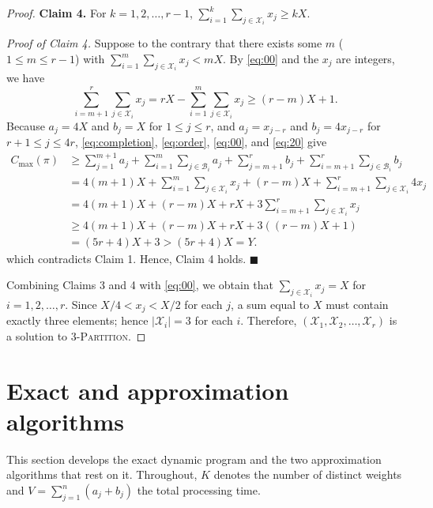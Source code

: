 \documentclass[12pt]{article}
\let\origsection\section
\renewcommand{\section}{\FloatBarrier\origsection}
\begin{document}
\begin{sloppypar}
\begin{proof}
            \textbf{Claim 4.} For $k=1, 2, \ldots, r-1$, $\sum_{i=1}^k \sum_{j \in \mathcal{X}_i} x_j \geq kX$. 
            
            \textit{Proof of Claim 4.} Suppose to the contrary that there exists some $m$ ($1 \leq m \leq r-1$) with $\sum_{i=1}^m \sum_{j \in \mathcal{X}_i} x_j < mX$. By \cref{eq:00} and the $x_j$ are integers, we have
            \begin{equation}\label{eq:20}
                \sum_{i=m+1}^r \sum_{j \in \mathcal{X}_i} x_j=rX-\sum_{i=1}^m \sum_{j \in \mathcal{X}_i} x_j \geq (r-m)X+1. 
            \end{equation}
            Because $a_j=4X$ and $b_j=X$ for $1 \leq j \leq r$, and $a_j=x_{j-r}$ and $b_j=4 x_{j-r}$ for $r+1 \leq j \leq 4r$, \cref{eq:completion}, \cref{eq:order}, \cref{eq:00}, and \cref{eq:20} give 
            \begin{align*}
                C_{\max}(\pi) & \geq \sum_{j=1}^{m+1} a_j+\sum_{i=1}^m \sum_{j \in \mathcal{B}_i} a_j+\sum_{j=m+1}^r      b_j+\sum_{i=m+1}^r \sum_{j \in \mathcal{B}_i} b_j  \nonumber \\ 
                &= 4(m+1)X+\sum_{i=1}^m \sum_{j \in \mathcal{X}_i} x_j +(r-m)X +\sum_{i=m+1}^r \sum_{j \in \mathcal{X}_i} 4 x_j \nonumber \\
                &= 4(m+1)X +(r-m)X + rX+ 3 \sum_{i=m+1}^r \sum_{j \in \mathcal{X}_i} x_j \\
                & \geq 4(m+1)X +(r-m)X + rX+ 3((r-m)X+1)  \nonumber \\
                & = (5r+4)X +3 > (5r+4)X = Y. \nonumber
            \end{align*} 
            which contradicts Claim 1. Hence, Claim 4 holds. \hfill$\blacksquare$
            
            Combining Claims 3 and 4 with \cref{eq:00}, we obtain that $\sum_{j \in \mathcal{X}_i} x_j=X$ for $i=1, 2, \ldots, r$. Since $X/4 < x_j < X/2$ for each $j$, a sum equal to $X$ must contain exactly three elements; hence  $|\mathcal{X}_i|=3$ for each $i$. Therefore, $(\mathcal{X}_1, \mathcal{X}_2, \ldots, \mathcal{X}_r)$ is a solution to 3-\textsc{Partition}.
        \end{proof}
        
        \section{Exact and approximation algorithms}
        \label{sec:dp_algorithm}
        This section develops the exact dynamic program and the two approximation algorithms that
        rest on it. Throughout, $K$ denotes the number of distinct weights and
        $V=\sum_{j=1}^{n}(a_j+b_j)$ the total processing time.
        

\end{sloppypar}
\end{document}
